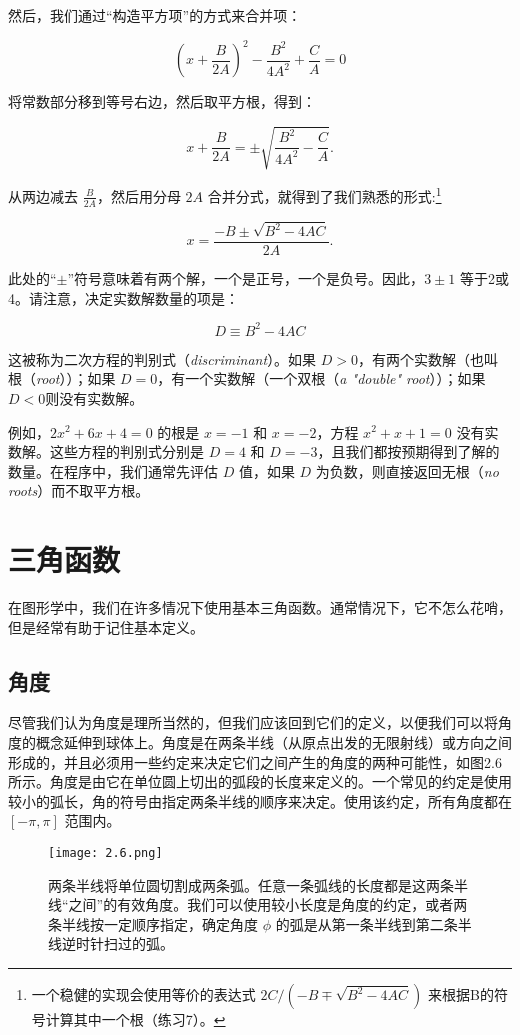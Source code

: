 \documentclass[lang=cn,12pt]{elegantbook}
\begin{document}
然后，我们通过“构造平方项”的方式来合并项：

$$\left(x+\frac{B}{2 A}\right)^{2}-\frac{B^{2}}{4 A^{2}}+\frac{C}{A}=0$$

将常数部分移到等号右边，然后取平方根，得到：

$$
x+\frac{B}{2 A}=\pm \sqrt{\frac{B^{2}}{4 A^{2}}-\frac{C}{A}} .
$$

从两边减去 $\frac{B}{2 A}$，然后用分母 $2A$ 合并分式，就得到了我们熟悉的形式:\footnote[1]{一个稳健的实现会使用等价的表达式 $2 C /\left(-B \mp \sqrt{B^{2}-4 A C}\right)$ 来根据B的符号计算其中一个根（练习7）。}


\begin{equation} x=\frac{-B \pm \sqrt{B^{2}-4 A C}}{2 A} . \end{equation}

此处的“$\pm$”符号意味着有两个解，一个是正号，一个是负号。因此，$3\pm1$ 等于2或4。请注意，决定实数解数量的项是：

$$
D \equiv B^{2}-4 A C
$$

这被称为二次方程的判别式（\textit{discriminant}）。如果 $D>0$，有两个实数解（也叫根（\textit{root}））；如果 $D=0$，有一个实数解（一个双根（\textit{a "double" root}））；如果 $D<0$则没有实数解。

例如，$2x^2+6x+4=0$ 的根是 $x=-1$ 和 $x=-2$，方程 $x^2+x+1=0$ 没有实数解。这些方程的判别式分别是 $D=4$ 和 $D=-3$，且我们都按预期得到了解的数量。在程序中，我们通常先评估 $D$ 值，如果 $D$ 为负数，则直接返回无根（\textit{no roots}）而不取平方根。

\section{三角函数}

在图形学中，我们在许多情况下使用基本三角函数。通常情况下，它不怎么花哨，但是经常有助于记住基本定义。

\subsection{角度}

尽管我们认为角度是理所当然的，但我们应该回到它们的定义，以便我们可以将角度的概念延伸到球体上。角度是在两条半线（从原点出发的无限射线）或方向之间形成的，并且必须用一些约定来决定它们之间产生的角度的两种可能性，如图2.6所示。角度是由它在单位圆上切出的弧段的长度来定义的。一个常见的约定是使用较小的弧长，角的符号由指定两条半线的顺序来决定。使用该约定，所有角度都在 $[-\pi, \pi]$ 范围内。

\begin{figure}[htbp]
\centering
\texttt{[image: 2.6.png]}
\caption{两条半线将单位圆切割成两条弧。任意一条弧线的长度都是这两条半线“之间”的有效角度。我们可以使用较小长度是角度的约定，或者两条半线按一定顺序指定，确定角度 $\phi$ 的弧是从第一条半线到第二条半线逆时针扫过的弧。}
\end{figure}
\end{document}

